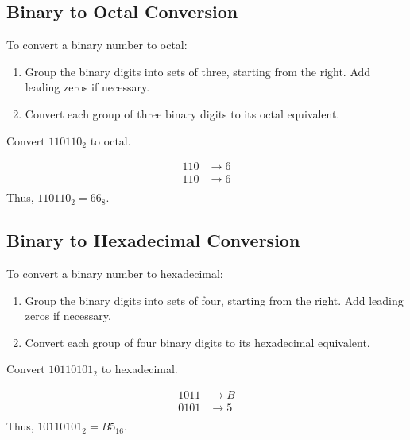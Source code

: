 \subsection*{Binary to Octal Conversion}
To convert a binary number to octal:
\begin{enumerate}
    \item Group the binary digits into sets of three, starting from the right. Add leading zeros if necessary.
    \item Convert each group of three binary digits to its octal equivalent.
\end{enumerate}

\begin{example}Convert \(110110_2\) to octal.

\begin{solution}
\[
\begin{aligned}
110 & \rightarrow 6 \\
110 & \rightarrow 6 \\
\end{aligned}
\]
Thus, \(110110_2 = 66_8\). \end{solution}

\end{example}

\subsection*{Binary to Hexadecimal Conversion}
To convert a binary number to hexadecimal:
\begin{enumerate}
    \item Group the binary digits into sets of four, starting from the right. Add leading zeros if necessary.
    \item Convert each group of four binary digits to its hexadecimal equivalent.
\end{enumerate}

\begin{example}Convert \(10110101_2\) to hexadecimal.

\begin{solution}
\[
\begin{aligned}
1011 & \rightarrow B \\
0101 & \rightarrow 5 \\
\end{aligned}
\]
Thus, \(10110101_2 = B5_{16}\). \end{solution}

\end{example}


